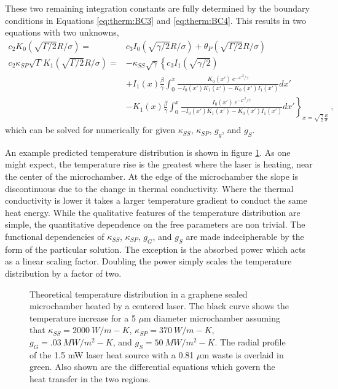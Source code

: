 These two remaining integration constants are fully determined by the boundary conditions in Equations \ref{eq:therm:BC3} and \ref{eq:therm:BC4}.
This results in two equations with two unknowns,
\begin{align*}
	c_2 K_0(\sqrt{\Gamma/2} R/\sigma)=&c_3 I_0(\sqrt{\gamma/2} R/\sigma)+\theta_P (\sqrt{\Gamma/2} R/\sigma) \\
	c_2 \kappa_{SP} \sqrt{\Gamma} K_1 (\sqrt{\Gamma/2} R/\sigma) =&
		-\kappa_{SS} \sqrt{\gamma} \left \{c_3 I_1(\sqrt{\gamma/2} ) \right. \\
		&+I_1(x) \frac{\beta}{\gamma} \int_0^{x} 
			\frac{K_0(x') \ e^{-x'^2/\gamma} }{-I_0(x') K_1 (x')-K_0(x') I_1 (x')} dx' \\
		&\left.-K_1(x) \frac{\beta}{\gamma} \int_0^{x}
			\frac{I_0(x') \ e^{-x'^2/\gamma} }{-I_0(x') K_1 (x')-K_0(x') I_1 (x')} dx' 	
		\right \}_{x=\sqrt{\frac{\gamma}{2}} \frac{R}{\sigma}} \ ,
\end{align*}
which can be solved for numerically for given $\kappa_{SS}$, $\kappa_{SP}$, $g_g$, and $g_S$.

An example predicted temperature distribution is shown in figure \ref{fig:therm:HTPlot}.
As one might expect, the temperature rise is the greatest where the laser is heating, near the center of the microchamber.
At the edge of the microchamber the slope is discontinuous due to the change in thermal conductivity.
Where the thermal conductivity is lower it takes a larger temperature gradient to conduct the same heat energy.
While the qualitative features of the temperature distribution are simple, the quantitative dependence on the free parameters are non trivial.
The functional dependencies of $\kappa_{SS}$, $\kappa_{SP}$, $g_G$, and $g_S$ are made indecipherable by the form of the particular solution.
The exception is the absorbed power which acts as a linear scaling factor.
Doubling the power simply scales the temperature distribution by a factor of two. 

\begin{figure}
	\begin{center}
	
	\end{center}
	\caption[Expected temperature distribution in a graphene sealed microchamber heated by a centered laser]
	{\label{fig:therm:HTPlot}
		Theoretical temperature distribution in a graphene sealed microchamber heated by a centered laser.
		The black curve shows the temperature increase for a 5 $\mu$m diameter microchamber assuming that $\kappa_{SS}=2000 \ W/m-K$, $\kappa_{SP}=370 \ W/m-K$, $g_{G}=.03 \ MW/m^2-K$, and $g_{S}=50 \ MW/m^2-K$.
		The radial profile of the 1.5 mW laser heat source with a 0.81 $\mu$m waste is overlaid in green.
		Also shown are the differential equations which govern the heat transfer in the two regions.
	}
\end{figure}